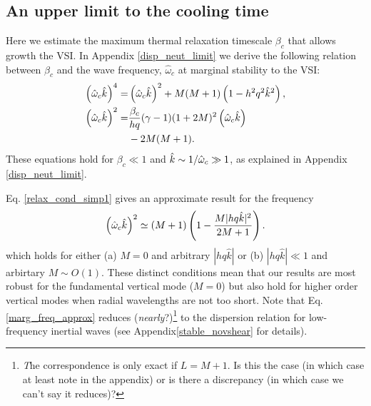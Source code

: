 \subsection{An upper limit to the cooling time}\label{iso_vsi_beta_crit}
Here we estimate the maximum thermal relaxation timescale 
$\beta_c$ that allows growth the VSI.  In Appendix \ref{disp_neut_limit}
we derive the following relation between $\beta_c$ and the wave frequency,
$\hat{\omega}_c$  at marginal stability to the VSI:
\begin{subequations}\begin{align}
 \left(\hat{\omega}_c\hat{k}\right)^4  = &  
 \left(\hat{\omega}_c\hat{k}\right)^2  + M(M+1)\left(1-h^2q^2\hat{k}^2\right) , \label{relax_cond_simp1} \\
   \left(\hat{\omega}_c\hat{k}\right)^2 = & \frac{\beta_c}{h q} (\gamma-1)(1+2M)^2
   \left(\hat{\omega}_c\hat{k}\right) \label{relax_cond_simp2}\\
   &- 2M(M+1) . \notag
\end{align}\end{subequations}
These equations hold for $\beta_c \ll 1$ and $\hat{k} \sim 1/\hat{\omega}_c \gg1$,
as explained in Appendix \ref{disp_neut_limit}.


Eq. \ref{relax_cond_simp1} gives an approximate result for the frequency
\begin{align}
  \left(\hat{\omega}_c\hat{k}\right)^2 \simeq (M+1)\left(1 -
    \frac{M|h q \hat{k}|^2}{2M+1}\right).  \label{marg_freq_approx}
\end{align}
which holds for either (a) $M= 0$ and arbitrary $|h q \hat{k}|$ or (b) $|h q \hat{k}| \ll 1$ and arbirtary $M \sim O(1)$. 
These distinct conditions mean that our results are most robust for the fundamental vertical mode ($M = 0$) but also
hold for higher order vertical modes when radial wavelengths are not too short.
Note that Eq. \ref{marg_freq_approx} 
reduces (\emph{nearly}?)\footnote{\emph The correspondence is only exact 
if $L = M+1$.  Is this the case (in which case at least note in the appendix) or is there a discrepancy (in which case 
we can't say it reduces)?}
 to the dispersion relation for low-frequency inertial waves 
(see Appendix\ref{stable_novshear} for details).

